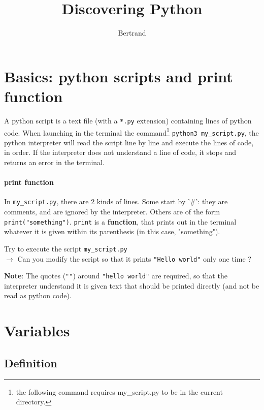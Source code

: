 \documentclass{article}
\title{Discovering Python}
\author{Bertrand}
\begin{document}
\maketitle

\section{Basics: python scripts and print function}


A python script is a text file (with a \texttt{*.py} extension) containing lines of python code.
When launching in the terminal the command\footnote{the following command requires my\_script.py to be in the current directory.} \texttt{python3 my\_script.py}, the python interpreter
will read the script line by line and execute the lines of code, in order.
If the interpreter does not understand a line of code, it stops and returns an error in the terminal.

\paragraph{print function} In \texttt{my\_script.py}, there are 2 kinds of
lines. Some start by '\#': they are comments, and are ignored by the interpreter.
Others are of the form \texttt{print("something")}. \texttt{print} is a \textbf{function}, that prints out in the terminal whatever it is given within its
parenthesis (in this case, "something").  

\begin{mdframed}[backgroundcolor=black!20!white]
Try to execute the script \texttt{my\_script.py}\\
$\rightarrow$ Can you modify the script so that it prints \texttt{"Hello world"}
only one time ?
\end{mdframed}

\begin{mdframed}[backgroundcolor=green!30!white]
\textbf{Note}: The quotes (\texttt{""}) around \texttt{"hello world"}
are required, so that the interpreter understand it is given text that should
be printed directly (and not be read as python code).
\end{mdframed}

\section{Variables}

\subsection{Definition}
\end{document}
